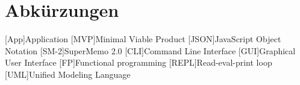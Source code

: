 \chapter{Abkürzungen}\label{a:Abkuerzungen}

\begin{acronym}
    [App]{Application}
    [MVP]{Minimal Viable Product}
    [JSON]{JavaScript Object Notation}
    [SM-2]{SuperMemo 2.0}
    [CLI]{Command Line Interface}
    [GUI]{Graphical User Interface}
    [FP]{Functional programming}
    [REPL]{Read-eval-print loop}
    [UML]{Unified Modeling Language}

\end{acronym}